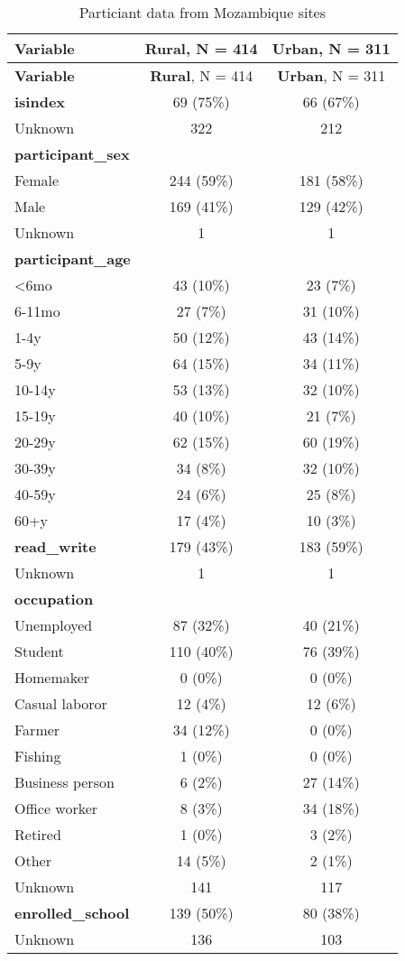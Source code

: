 \documentclass[
  letterpaper,
  DIV=11,
  numbers=noendperiod]{scrartcl}
\begin{document}
\hypertarget{tbl-summary-participants}{}
\begin{longtable}[]{@{}lcc@{}}
\caption{\label{tbl-summary-participants}Particiant data from Mozambique
sites}\tabularnewline
\toprule()
\textbf{Variable} & \textbf{Rural}, N = 414 & \textbf{Urban}, N = 311 \\
\midrule()
\endfirsthead
\toprule()
\textbf{Variable} & \textbf{Rural}, N = 414 & \textbf{Urban}, N = 311 \\
\midrule()
\endhead
\textbf{isindex} & 69 (75\%) & 66 (67\%) \\
Unknown & 322 & 212 \\
\textbf{participant\_sex} & & \\
Female & 244 (59\%) & 181 (58\%) \\
Male & 169 (41\%) & 129 (42\%) \\
Unknown & 1 & 1 \\
\textbf{participant\_age} & & \\
\textless6mo & 43 (10\%) & 23 (7\%) \\
6-11mo & 27 (7\%) & 31 (10\%) \\
1-4y & 50 (12\%) & 43 (14\%) \\
5-9y & 64 (15\%) & 34 (11\%) \\
10-14y & 53 (13\%) & 32 (10\%) \\
15-19y & 40 (10\%) & 21 (7\%) \\
20-29y & 62 (15\%) & 60 (19\%) \\
30-39y & 34 (8\%) & 32 (10\%) \\
40-59y & 24 (6\%) & 25 (8\%) \\
60+y & 17 (4\%) & 10 (3\%) \\
\textbf{read\_write} & 179 (43\%) & 183 (59\%) \\
Unknown & 1 & 1 \\
\textbf{occupation} & & \\
Unemployed & 87 (32\%) & 40 (21\%) \\
Student & 110 (40\%) & 76 (39\%) \\
Homemaker & 0 (0\%) & 0 (0\%) \\
Casual laboror & 12 (4\%) & 12 (6\%) \\
Farmer & 34 (12\%) & 0 (0\%) \\
Fishing & 1 (0\%) & 0 (0\%) \\
Business person & 6 (2\%) & 27 (14\%) \\
Office worker & 8 (3\%) & 34 (18\%) \\
Retired & 1 (0\%) & 3 (2\%) \\
Other & 14 (5\%) & 2 (1\%) \\
Unknown & 141 & 117 \\
\textbf{enrolled\_school} & 139 (50\%) & 80 (38\%) \\
Unknown & 136 & 103 \\
\bottomrule()
\end{longtable}
\end{document}
